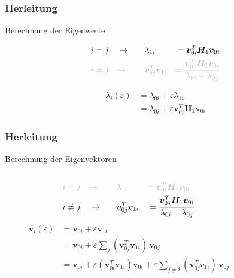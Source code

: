 \documentclass[ngerman, aspectratio=169]{beamer}
\newcommand*{\GR}{\textcolor{lightgray}}
\begin{document}
	\begin{frame}
        \frametitle{Herleitung}

        \begin{block}{Berechnung der Eigenwerte}

			\begin{alignat*}{3}
				i = j \quad & \rightarrow  \quad && \lambda_{1i}&& = \bm v_{0i}^T \bm H_1 \bm v_{0i} \\
				\GR{i \neq j \quad} & \GR{\rightarrow \quad} && \GR{\bm v_{0j}^T \bm v_{1i}} && \GR{= \frac{\bm v_{0j}^T \bm H_1 \bm v_{0i}}{\lambda_{0i} - \lambda_{0j}}}
			\end{alignat*}

			\begin{align*}
				\lambda_i(\varepsilon)
				&=
				\lambda_{0i} + \varepsilon \lambda_{1i} \\
				&=
				\lambda_{0i} + \varepsilon \bm v_{0i}^T \bm H_1 \bm v_{0i}
			\end{align*}
        \end{block}

	\end{frame}

	\begin{frame}
        \frametitle{Herleitung}

        \begin{block}{Berechnung der Eigenvektoren}
			\begin{columns}
				\begin{column}{0.5\textwidth}
					\begin{alignat*}{3}
						\GR{i = j \quad} & \GR{\rightarrow  \quad} && \GR{\lambda_{1i}} && \GR{= \bm v_{0i}^T \bm H_1 \bm v_{0i}} \\
						i \neq j \quad & \rightarrow \quad && \bm v_{0j}^T \bm v_{1i}&& = \frac{\bm v_{0j}^T \bm H_1 \bm v_{0i}}{\lambda_{0i} - \lambda_{0j}}
					\end{alignat*}
					\begin{align*}
						\bm v_i(\varepsilon)
						&=
						\bm v_{0i} + \varepsilon \bm v_{1i} \\
						&=
						\bm v_{0i} + \varepsilon \sum_{j} ( \bm v_{0j}^T \bm v_{1i}) \, \bm v_{0j} \\
						&=
						\bm v_{0i} + \varepsilon ( \bm v_{0i}^T \bm v_{1i}) \bm v_{0i} + \varepsilon \sum_{j \neq i} (\bm v_{0j}^T v_{1i}) \, \bm v_{0j}
					\end{align*}
				\end{column}
				\begin{column}{0.4\textwidth}
					\begin{center}
						
					\end{center}
				\end{column}
			\end{columns}
        \end{block}
	\end{frame}
\end{document}
